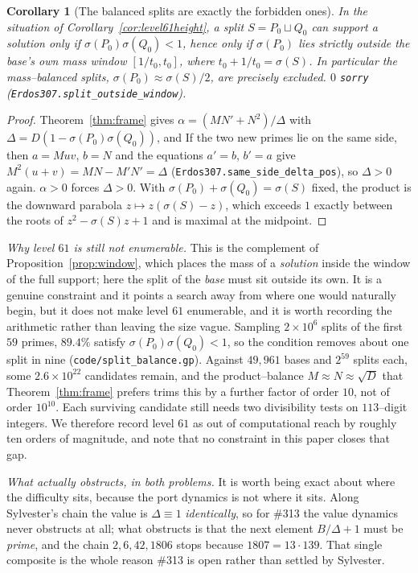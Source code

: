 \documentclass[11pt]{article}
\newtheorem{corollary}[theorem]{Corollary}
\theoremstyle{definition}
\begin{document}
\begin{corollary}[The balanced splits are exactly the forbidden ones]\label{cor:splitbalance}
In the situation of Corollary~\ref{cor:level61height}, a split $S=P_0\sqcup Q_0$ can support a
solution only if $\sigma(P_0)\sigma(Q_0)<1$, hence only if $\sigma(P_0)$ lies strictly \emph{outside}
the base's own mass window $[1/t_0,t_0]$, where $t_0+1/t_0=\sigma(S)$. In particular the
mass--balanced splits, $\sigma(P_0)\approx\sigma(S)/2$, are precisely excluded. $0$ \texttt{sorry}
\textup{(\texttt{Erdos307.split\_outside\_window})}.
\end{corollary}
\begin{proof}
Theorem~\ref{thm:frame} gives $\alpha=(MN'+N^2)/\Delta$ with $\Delta=D(1-\sigma(P_0)\sigma(Q_0))$, and
If the two new primes lie on the same side, then $a=Muv$, $b=N$ and the equations $a'=b$, $b'=a$ give
$M^2(u+v)=MN-M'N'=\Delta$ \textup{(}\texttt{Erdos307.same\_side\_delta\_pos}\textup{)}, so $\Delta>0$ again.
$\alpha>0$ forces $\Delta>0$. With $\sigma(P_0)+\sigma(Q_0)=\sigma(S)$ fixed, the product is the
downward parabola $z\mapsto z(\sigma(S)-z)$, which exceeds $1$ exactly between the roots of
$z^2-\sigma(S)z+1$ and is maximal at the midpoint.
\end{proof}

\emph{Why level $61$ is still not enumerable.} This is the complement of Proposition~\ref{prop:window}, which places the mass of a \emph{solution}
inside the window of the full support; here the split of the \emph{base} must sit outside its own.
It is a genuine constraint and it points a search away from where one would naturally begin, but it
does not make level $61$ enumerable, and it is worth recording the arithmetic rather than leaving the
size vague. Sampling $2\times10^{6}$ splits of the first $59$ primes, $89.4\%$ satisfy
$\sigma(P_0)\sigma(Q_0)<1$, so the condition removes about one split in nine
\textup{(\texttt{code/split\_balance.gp})}. Against $49{,}961$ bases and $2^{59}$ splits each, some
$2.6\times10^{22}$ candidates remain, and the product--balance $M\approx N\approx\sqrt D$ that
Theorem~\ref{thm:frame} prefers trims this by a further factor of order $10$, not of order $10^{10}$.
Each surviving candidate still needs two divisibility tests on $113$--digit integers. We therefore
record level $61$ as out of computational reach by roughly ten orders of magnitude, and note that no
constraint in this paper closes that gap.


\emph{What actually obstructs, in both problems.} It is worth being exact about where the difficulty sits, because the port dynamics is not where it
sits. Along Sylvester's chain the value is $\Delta\equiv1$ \emph{identically}, so for \#313 the value
dynamics never obstructs at all; what obstructs is that the next element $B/\Delta+1$ must be
\emph{prime}, and the chain $2,6,42,1806$ stops because $1807=13\cdot139$. That single composite is
the whole reason \#313 is open rather than settled by Sylvester.
\end{document}
